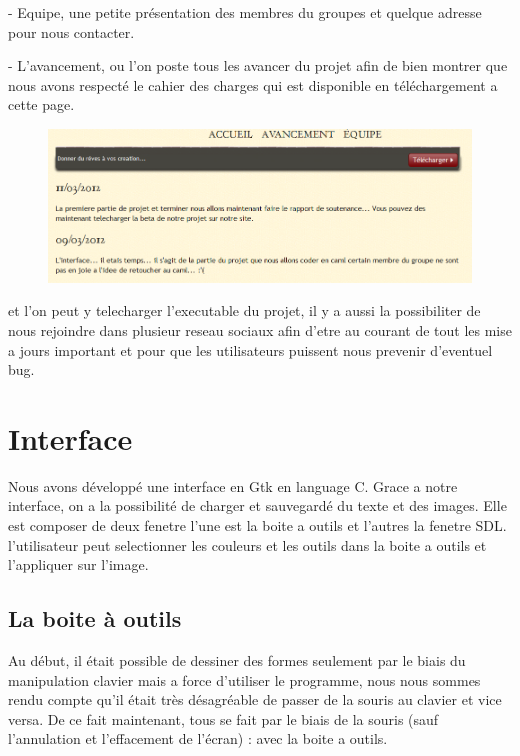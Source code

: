 \documentclass[12pt, a4paper]{report}
\begin{document}
\par -  Equipe, une petite présentation des membres du groupes et quelque adresse pour nous contacter.

\newpage

\par - L'avancement, ou l'on poste tous les avancer du projet afin de bien montrer que nous avons respecté le cahier des charges qui est disponible en téléchargement a cette page.

\begin{figure}[!h]
\begin{center} \includegraphics[width=1\textwidth]{images/avancement.png} \end{center}
\end{figure}


et l'on peut y telecharger l'executable du projet, il y a aussi la possibiliter de nous rejoindre dans plusieur reseau sociaux afin d'etre au courant de tout les mise a jours important et pour que les utilisateurs puissent nous prevenir d'eventuel bug.


\newpage





\chapter{Interface}


Nous avons développé une interface en Gtk en language C.
Grace a notre interface, on a la possibilité de charger et sauvegardé du texte et des images. 
Elle est composer de deux fenetre l'une est la boite a outils et l'autres la fenetre SDL.
l'utilisateur peut selectionner les couleurs et les outils dans la boite a outils et l'appliquer sur l'image. 

\section {La boite à outils}

Au début, il était possible de dessiner des formes seulement par le biais du manipulation clavier mais a force d’utiliser le programme,  nous nous sommes  rendu compte qu’il était très désagréable de passer de la souris au clavier et vice versa. De ce fait maintenant, tous se fait par le biais de la souris (sauf l’annulation et l’effacement de l’écran) : avec la boite a outils.
\end{document}
